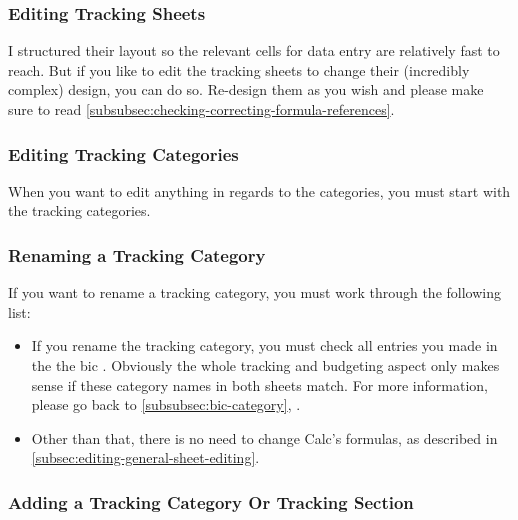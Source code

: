 \subsubsection{Editing Tracking Sheets}
\label{subsubsec:editing-tracking-sheets}

I structured their layout so the relevant cells for data entry are relatively fast to reach.
But if you like to edit the tracking sheets to change their (incredibly complex) design, you can do so.
Re-design them as you wish and please make sure to read \autoref{subsubsec:checking-correcting-formula-references}.

\subsubsection{Editing Tracking Categories}
\label{subsubsec:editing-tracking-categories}

When you want to edit anything in regards to the categories, you must start with the tracking categories.

\subsubsection{Renaming a Tracking Category}
\label{subsubsec:renaming-a-tracking-category}

If you want to rename a tracking category, you must work through the following list:
\begin{itemize}
	\item If you rename the tracking category, you must check all entries you made in the the \ac{bic} .
	Obviously the whole tracking and budgeting aspect only makes sense if these category names in both sheets match.
	For more information, please go back to \autoref{subsubsec:bic-category}, .
	\item Other than that, there is no need to change Calc's formulas, as described in \autoref{subsec:editing-general-sheet-editing}.
\end{itemize}

\subsubsection{Adding a Tracking Category Or Tracking Section}
\label{subsubsec:adding-a-tracking-category-section}

